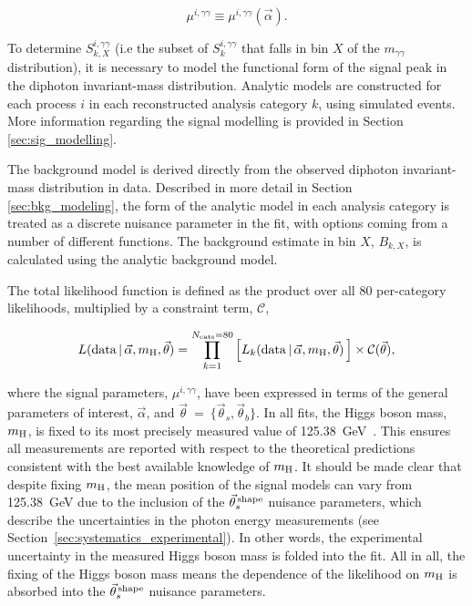 \begin{equation}
    \mu^{i,\gamma\gamma} \equiv \mu^{i,\gamma\gamma}(\vec{\alpha}).
\end{equation}

To determine $S_{k,X}^{i,\gamma\gamma}$ (i.e the subset of $S_k^{i,\gamma\gamma}$ that falls in bin $X$ of the $m_{\gamma\gamma}$ distribution), it is necessary to model the functional form of the signal peak in the diphoton invariant-mass distribution. Analytic models are constructed for each process $i$ in each reconstructed analysis category $k$, using simulated events. More information regarding the signal modelling is provided in Section \ref{sec:sig_modelling}.

The background model is derived directly from the observed diphoton invariant-mass distribution in data. Described in more detail in Section \ref{sec:bkg_modeling}, the form of the analytic model in each analysis category is treated as a discrete nuisance parameter in the fit, with options coming from a number of different functions. The background estimate in bin $X$, $B_{k,X}$, is calculated using the analytic background model.

The total likelihood function is defined as the product over all 80 per-category likelihoods, multiplied by a constraint term, $\mathcal{C}$,

\begin{equation}
    L({\rm{data}}\,|\,\vec{\alpha},m_{\rm{H}},\vec{\theta}) = \prod_{k=1}^{N_{\rm{cats}}=80} \Big[    L_k({\rm{data}}\,|\,\vec{\alpha},m_{\rm{H}},\vec{\theta}) \,\Big] \times \mathcal{C}(\vec{\theta}) ,
\end{equation}

\noindent
where the signal parameters, $\mu^{i,\gamma\gamma}$, have been expressed in terms of the general parameters of interest, $\vec{\alpha}$, and $\vec{\theta}$~=~$\{\vec{\theta}_s,\vec{\theta}_b\}$. In all fits, the Higgs boson mass, $m_{\rm{H}}$, is fixed to its most precisely measured value of 125.38~GeV~\cite{Sirunyan:2020xwk}. This ensures all measurements are reported with respect to the theoretical predictions consistent with the best available knowledge of $m_{\rm{H}}$. It should be made clear that despite fixing $m_{\rm{H}}$, the mean position of the signal models can vary from 125.38~GeV due to the inclusion of the $\vec{\theta}^{\,\rm{shape}}_{s}$ nuisance parameters, which describe the uncertainties in the photon energy measurements (see Section~\ref{sec:systematics_experimental}). In other words, the experimental uncertainty in the measured Higgs boson mass is folded into the fit. All in all, the fixing of the Higgs boson mass means the dependence of the likelihood on $m_{\rm{H}}$ is absorbed into the $\vec{\theta}^{\,\rm{shape}}_{s}$ nuisance parameters.

